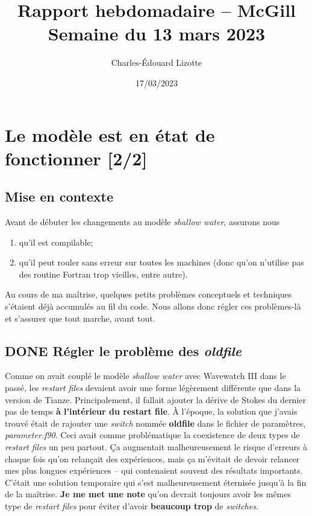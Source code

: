 \documentclass{article}
\author{Charles-Édouard Lizotte}
\date{17/03/2023}
\title{Rapport hebdomadaire -- McGill\\\medskip
\large Semaine du 13 mars 2023}
\numberwithin{equation}{section}
\begin{document}
\maketitle
\tableofcontents


\section{Le modèle est en état de fonctionner [2/2]}
\label{sec:org0a3f6ef}
\subsection{Mise en contexte}
\label{sec:orgddda2ba}
Avant de débuter les changements au modèle \emph{shallow water}, assurons nous 
\begin{enumerate}
\item qu'il est compilable;
\item qu'il peut rouler sans erreur sur toutes les machines (donc qu'on n'utilise pas des routine Fortran trop vieilles, entre autre).
\end{enumerate}
Au cours de ma maîtrise, quelques petits problèmes conceptuels et techniques s'étaient déjà accumulés au fil du code.
Nous allons donc régler ces problèmes-là et s'assurer que tout marche, avant tout. 

\subsection{{\bfseries\sffamily DONE} Régler le problème des \emph{oldfile}}
\label{sec:orge5508a9}
Comme on avait couplé le modèle \emph{shallow water} avec Wavewatch III dans le passé, les \emph{restart files} devaient avoir une forme légèrement différente que dans la version de Tianze.
Principalement, il fallait ajouter la dérive de Stokes du dernier pas de temps \textbf{à l'intérieur du restart file}.
À l'époque, la solution que j'avais trouvé était de rajouter une \emph{switch} nommée \textbf{oldfile} dans le fichier de paramètres, \emph{parameter.f90}.
Ceci avait comme problématique la coexistence de deux types de \emph{restart files} un peu partout. 
Ça augmentait malheureusement le risque d'erreurs à chaque fois qu'on relançait des expériences, mais ça m'évitait de devoir relancer mes plus longues expériences -- qui contenaient souvent des résultats importants.
C'était une solution temporaire qui s'est malheureusement éternisée jusqu'à la fin de la maîtrise. 
\textbf{Je me met une note} qu'on devrait toujours avoir les mêmes type de \emph{restart files} pour éviter d'avoir \textbf{beaucoup trop} de \emph{switches}.\\[0pt]
\end{document}
